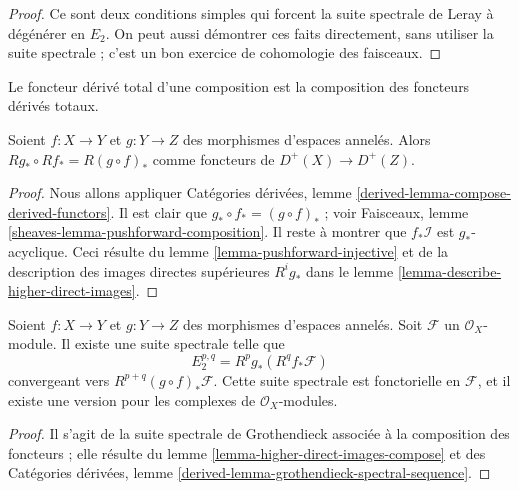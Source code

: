 \begin{proof}

Ce sont deux conditions simples qui forcent la suite spectrale de Leray à dégénérer en $E_2$. On peut aussi démontrer ces faits directement, sans utiliser la suite spectrale ; c'est un bon exercice de cohomologie des faisceaux.

\end{proof}

\begin{lemma}

\label{lemma-higher-direct-images-compose}

\begin{slogan}
Le foncteur dérivé total d'une composition est la composition des foncteurs dérivés totaux.
\end{slogan}
Soient $f : X \to Y$ et $g : Y \to Z$ des morphismes d'espaces annelés. Alors $Rg_* \circ Rf_* = R(g \circ f)_*$ comme foncteurs de $D^{+}(X) \to D^{+}(Z)$.
\end{lemma}

\begin{proof}
Nous allons appliquer Catégories dérivées, lemme \ref{derived-lemma-compose-derived-functors}. Il est clair que $g_* \circ f_* = (g \circ f)_*$ ; voir Faisceaux, lemme \ref{sheaves-lemma-pushforward-composition}. Il reste à montrer que $f_*\mathcal{I}$ est $g_*$-acyclique. Ceci résulte du lemme \ref{lemma-pushforward-injective} et de la description des images directes supérieures $R^ig_*$ dans le lemme \ref{lemma-describe-higher-direct-images}.
\end{proof}

\begin{lemma}
\label{lemma-relative-Leray}
Soient $f : X \to Y$ et $g : Y \to Z$ des morphismes d'espaces annelés. Soit $\mathcal{F}$ un $\mathcal{O}_X$-module. Il existe une suite spectrale telle que $$
E_2^{p, q} = R^pg_*(R^qf_*\mathcal{F})
$$ convergeant vers $R^{p + q}(g \circ f)_*\mathcal{F}$. Cette suite spectrale est fonctorielle en $\mathcal{F}$, et il existe une version pour les complexes de $\mathcal{O}_X$-modules.
\end{lemma}

\begin{proof}
Il s'agit de la suite spectrale de Grothendieck associée à la composition des foncteurs ; elle résulte du lemme \ref{lemma-higher-direct-images-compose} et des Catégories dérivées, lemme \ref{derived-lemma-grothendieck-spectral-sequence}.
\end{proof}













